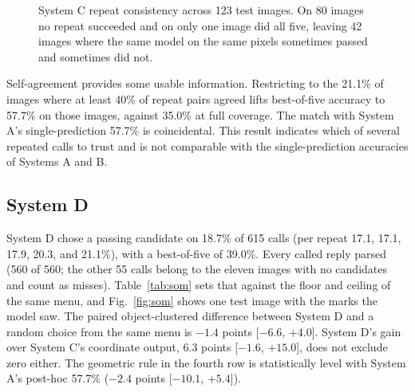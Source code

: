 \documentclass[12pt,letterpaper]{article}
\begin{document}
\begin{figure}[H]
\centering
{}
\caption{System C repeat consistency across 123 test images. On 80
images no repeat succeeded and on only one image did all five, leaving
42 images where the same model on the same pixels sometimes passed and
sometimes did not.}
\label{fig:repeats}
\end{figure}

Self-agreement provides some usable information. Restricting to the
21.1\% of images where at least 40\% of repeat pairs agreed lifts
best-of-five accuracy to 57.7\% on those images, against 35.0\% at full
coverage. The match with System A's single-prediction 57.7\% is
coincidental. This result indicates which of several repeated calls to
trust and is not comparable with the single-prediction accuracies of
Systems A and B.

\subsection{System D}\label{sec:res-d}

System D chose a passing candidate on 18.7\% of 615 calls (per repeat
17.1, 17.1, 17.9, 20.3, and 21.1\%), with a best-of-five of 39.0\%.
Every called reply parsed (560 of 560; the other 55 calls belong to the
eleven images with no candidates and count as misses).
Table~\ref{tab:som} sets that against the floor and ceiling of the same
menu, and Fig.~\ref{fig:som} shows one test image with the marks the
model saw. The paired object-clustered difference between System D and a
random choice from the same menu is $-1.4$ points [$-6.6$, $+4.0$].
System D's gain over System C's coordinate output, 6.3 points [$-1.6$,
$+15.0$], does not exclude zero either. The geometric rule in the fourth
row is statistically level with System A's post-hoc 57.7\% ($-2.4$
points [$-10.1$, $+5.4$]).
\end{document}
